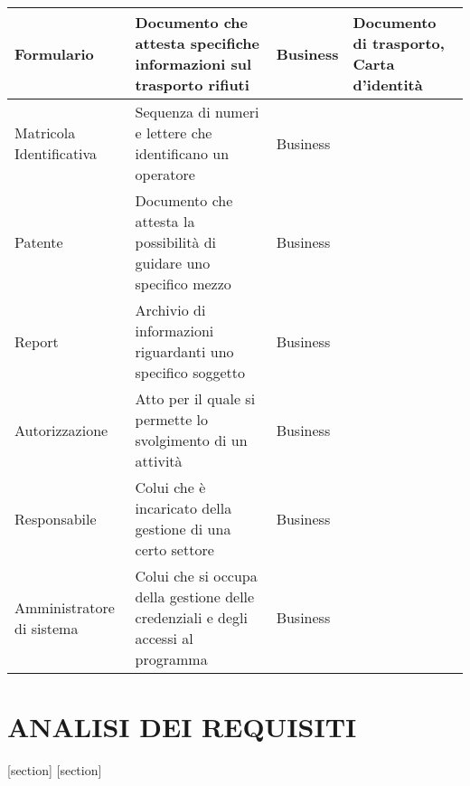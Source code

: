 \documentclass[green, fancy, 11pt]{elegantbook}
\begin{document}
{\begin{tabular}{|p{}|p{6cm}|l|p{4cm}|}
	\hline
	Formulario &Documento che attesta specifiche informazioni sul trasporto rifiuti&Business &Documento di trasporto, Carta d'identità\\
	\hline
	Matricola Identificativa &Sequenza di numeri e lettere che identificano un operatore &Business&\\
	\hline
	Patente &Documento che attesta la possibilità di guidare uno specifico mezzo &Business&\\
	\hline
	Report &Archivio di informazioni riguardanti uno specifico soggetto &Business&\\
	\hline
	Autorizzazione &Atto per il quale si permette lo svolgimento di un attività &Business&\\
	\hline
	Responsabile &Colui che è incaricato della gestione di una certo settore&Business&\\
	\hline
	Amministratore di sistema &Colui che si occupa della gestione delle credenziali e degli accessi al programma &Business&\\
	\hline 
\end{tabular}
}
\newpage

\chapter{ANALISI DEI REQUISITI}

[section]
[section]
\end{document}

